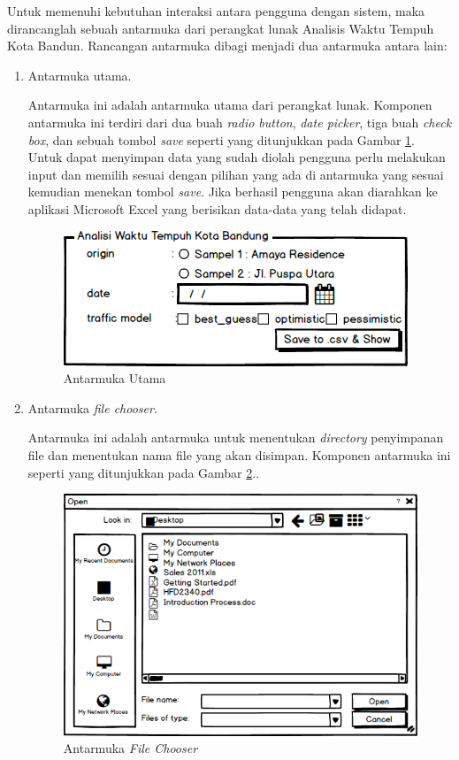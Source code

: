 Untuk memenuhi kebutuhan interaksi antara pengguna dengan sistem, maka dirancanglah sebuah antarmuka dari perangkat lunak Analisis Waktu Tempuh Kota Bandun. Rancangan antarmuka dibagi menjadi dua antarmuka antara lain:
\begin{enumerate}
	\item Antarmuka utama.
	
	Antarmuka ini adalah antarmuka utama dari perangkat lunak. Komponen antarmuka ini terdiri dari dua buah \textit{radio button}, \textit{date picker}, tiga buah \textit{check box}, dan sebuah tombol \textit{save} seperti yang ditunjukkan pada Gambar \ref{fig:antarmukautama}. Untuk dapat menyimpan data yang sudah diolah pengguna perlu melakukan input dan memilih sesuai dengan pilihan yang ada di antarmuka yang sesuai kemudian menekan tombol \textit{save}. Jika berhasil pengguna akan diarahkan ke aplikasi Microsoft Excel yang berisikan data-data yang telah didapat.
	
	\begin{figure}[H]
				\centering		
				\includegraphics[scale=0.7]{Gambar/Antarmukautama.png}
				\caption[Antarmuka Utama]{Antarmuka Utama}
				\label{fig:antarmukautama}	
			\end{figure}
	
	\item Antarmuka \textit{file chooser}.
	
	Antarmuka ini adalah antarmuka untuk menentukan \textit{directory} penyimpanan file dan menentukan nama file yang akan disimpan. Komponen antarmuka ini seperti yang ditunjukkan pada Gambar \ref{fig:antarmukafilechooser}..
	
	\begin{figure}[H]
				\centering		
				\includegraphics[scale=0.5]{Gambar/WindowsOpenFileDialog.png}
				\caption[Antarmuka \textit{File Chooser}]{Antarmuka \textit{File Chooser}}
				\label{fig:antarmukafilechooser}	
			\end{figure}

\end{enumerate}
